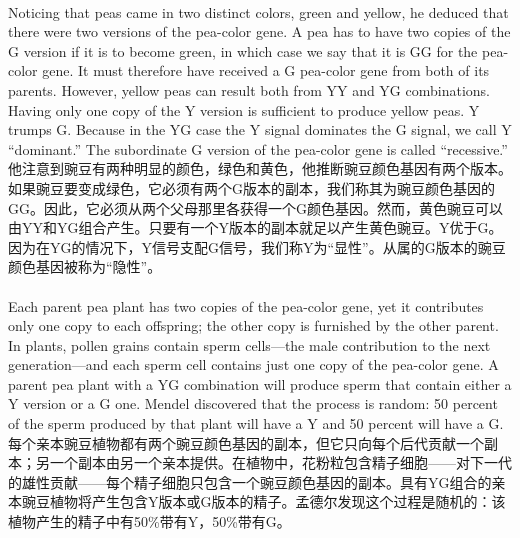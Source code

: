 \documentclass{article}
\begin{document}
\\
Noticing that peas came in two distinct colors, green and yellow, he deduced that there were two versions of the pea-color gene. A pea has to have two copies of the G version if it is to become green, in which case we say that it is GG for the pea-color gene. It must therefore have received a G pea-color gene from both of its parents. However, yellow peas can result both from YY and YG combinations. Having only one copy of the Y version is sufficient to produce yellow peas. Y trumps G. Because in the YG case the Y signal dominates the G signal, we call Y “dominant.” The subordinate G version of the pea-color gene is called “recessive.”\\
他注意到豌豆有两种明显的颜色，绿色和黄色，他推断豌豆颜色基因有两个版本。如果豌豆要变成绿色，它必须有两个G版本的副本，我们称其为豌豆颜色基因的GG。因此，它必须从两个父母那里各获得一个G颜色基因。然而，黄色豌豆可以由YY和YG组合产生。只要有一个Y版本的副本就足以产生黄色豌豆。Y优于G。因为在YG的情况下，Y信号支配G信号，我们称Y为“显性”。从属的G版本的豌豆颜色基因被称为“隐性”。\\

\\
Each parent pea plant has two copies of the pea-color gene, yet it contributes only one copy to each offspring; the other copy is furnished by the other parent. In plants, pollen grains contain sperm cells—the male contribution to the next generation—and each sperm cell contains just one copy of the pea-color gene. A parent pea plant with a YG combination will produce sperm that contain either a Y version or a G one. Mendel discovered that the process is random: 50 percent of the sperm produced by that plant will have a Y and 50 percent will have a G.\\
每个亲本豌豆植物都有两个豌豆颜色基因的副本，但它只向每个后代贡献一个副本；另一个副本由另一个亲本提供。在植物中，花粉粒包含精子细胞——对下一代的雄性贡献——每个精子细胞只包含一个豌豆颜色基因的副本。具有YG组合的亲本豌豆植物将产生包含Y版本或G版本的精子。孟德尔发现这个过程是随机的：该植物产生的精子中有50\%带有Y，50\%带有G。\\
\end{document}
